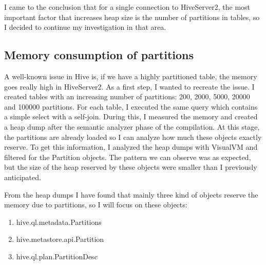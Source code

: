 I came to the conclusion that for a single connection to HiveServer2, the most important factor that increases heap size is the number of partitions in tables, so I decided to continue my investigation in that area. 

\subsection{Memory consumption of partitions}
A well-known issue in Hive is, if we have a highly partitioned table, the memory goes really high in HiveServer2. As a first step, I wanted to recreate the issue. I created tables with an increasing number of partitions: 200, 2000, 5000, 20000 and 100000 partitions. For each table, I executed the same query which contains a simple select with a self-join. During this, I measured the memory and created a heap dump after the semantic analyzer phase of the compilation. At this stage, the partitions are already loaded so I can analyze how much these objects exactly reserve. To get this information, I analyzed the heap dumps with VisualVM and filtered for the Partition objects. The pattern we can observe was as expected, but the size of the heap reserved by these objects were smaller than I previously anticipated.

\noindent From the heap dumps I have found that mainly three kind of objects reserve the memory due to partitions, so I will focus on these objects: 
\begin{enumerate}
	\item hive.ql.metadata.Partitions
	\item hive.metastore.api.Partition
	\item hive.ql.plan.PartitionDesc
\end{enumerate}

